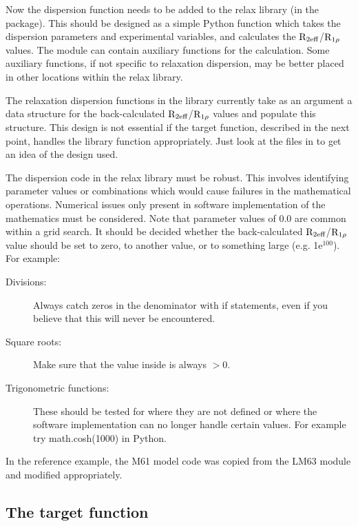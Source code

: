 Now the dispersion function needs to be added to the relax library (in the  package).  This should be designed as a simple Python function which takes the dispersion parameters and experimental variables, and calculates the $\mathrm{R}_{2\textrm{eff}}$/$\mathrm{R}_{1\rho}$ values.  The module can contain auxiliary functions for the calculation.  Some auxiliary functions, if not specific to relaxation dispersion, may be better placed in other locations within the relax library.

The relaxation dispersion functions in the library currently take as an argument a data structure for the back-calculated $\mathrm{R}_{2\textrm{eff}}$/$\mathrm{R}_{1\rho}$ values and populate this structure.  This design is not essential if the target function, described in the next point, handles the library function appropriately.  Just look at the files in  to get an idea of the design used.

The dispersion code in the relax library must be robust.  This involves identifying parameter values or combinations which would cause failures in the mathematical operations.  Numerical issues only present in software implementation of the mathematics must be considered.  Note that parameter values of 0.0 are common within a grid search.  It should be decided whether the back-calculated $\mathrm{R}_{2\textrm{eff}}$/$\mathrm{R}_{1\rho}$ value should be set to zero, to another value, or to something large (e.g. 1e$^{100}$).  For example:

\begin{description}
\item[Divisions:]  Always catch zeros in the denominator with if statements, even if you believe that this will never be encountered.
\item[Square roots:]  Make sure that the value inside is always $> 0$.
\item[Trigonometric functions:]  These should be tested for where they are not defined or where the software implementation can no longer handle certain values.  For example try math.cosh(1000) in Python.
\end{description}

In the reference example, the M61 model code was copied from the LM63 module and modified appropriately.


\subsection{The target function}

